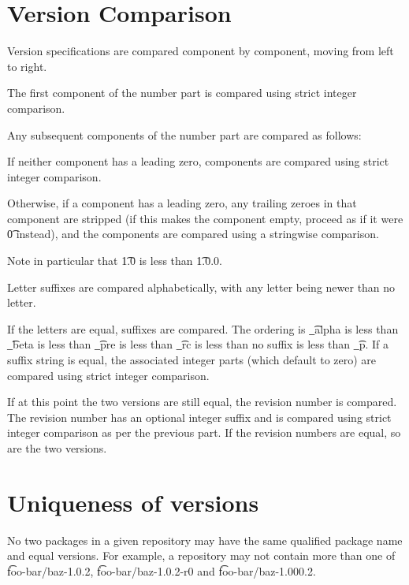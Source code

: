 \section{Version Comparison}

Version specifications are compared component by component, moving from left to right.

The first component of the number part is compared using strict integer comparison.

Any subsequent components of the number part are compared as follows:

\begin{compactitem}
\item If neither component has a leading zero, components are compared using strict integer
  comparison.
\item Otherwise, if a component has a leading zero, any trailing zeroes in that component
  are stripped (if this makes the component empty, proceed as if it were \t{0} instead),
  and the components are compared using a stringwise comparison.
\end{compactitem}

Note in particular that \t{1.0} is less than \t{1.0.0}.

Letter suffixes are compared alphabetically, with any letter being newer than no letter.

If the letters are equal, suffixes are compared. The ordering is \t{\_alpha} is less than
\t{\_beta} is less than \t{\_pre} is less than \t{\_rc} is less than no suffix is less than
\t{\_p}. If a suffix string is equal, the associated integer parts (which default to zero)
are compared using strict integer comparison.

If at this point the two versions are still equal, the revision number is compared. The revision
number has an optional integer suffix and is compared using strict integer comparison as per the
previous part. If the revision numbers are equal, so are the two versions.

\section{Uniqueness of versions}

No two packages in a given repository may have the same qualified package name and equal versions.
For example, a repository may not contain more than one of \t{foo-bar/baz-1.0.2},
\t{foo-bar/baz-1.0.2-r0} and \t{foo-bar/baz-1.000.2}.

